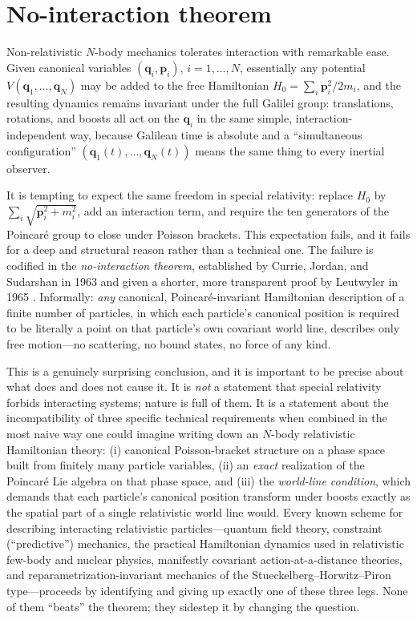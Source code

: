 \section{No-interaction theorem}
\label{sec:sr-no-int}

Non-relativistic $N$-body mechanics tolerates interaction with remarkable ease.
Given canonical variables $({\bm q}_i,{\bm p}_i)$, $i=1,\dots,N$, essentially any
potential $V({\bm q}_1,\dots,{\bm q}_N)$ may be added to the free Hamiltonian
$H_0=\sum_i {\bm p}_i^2/2m_i$, and the resulting dynamics remains invariant under
the full Galilei group: translations, rotations, and boosts all act on the
${\bm q}_i$ in the same simple, interaction-independent way, because Galilean time
is absolute and a ``simultaneous configuration'' $({\bm q}_1(t),\dots,{\bm q}_N(t))$
means the same thing to every inertial observer.

It is tempting to expect the same freedom in special relativity: replace $H_0$
by $\sum_i\sqrt{{\bm p}_i^2+m_i^2}$, add an interaction term, and require the ten
generators of the Poincar\'e group to close under Poisson brackets. This
expectation fails, and it fails for a deep and structural reason rather than a
technical one. The failure is codified in the \emph{no-interaction theorem},
established by Currie, Jordan, and Sudarshan in 1963 \cite{CurrieJordanSudarshan1963}
and given a shorter, more transparent proof by Leutwyler in 1965
\cite{Leutwyler1965}. Informally: \emph{any} canonical,
Poincar\'e-invariant Hamiltonian description of a finite number of particles,
in which each particle's canonical position is required to be literally a point
on that particle's own covariant world line, describes only free motion---no
scattering, no bound states, no force of any kind.

This is a genuinely surprising conclusion, and it is important to be precise
about what does and does not cause it. It is \emph{not} a statement that
special relativity forbids interacting systems; nature is full of them. It is a
statement about the incompatibility of three specific technical requirements
when combined in the most naive way one could imagine writing down an $N$-body
relativistic Hamiltonian theory: (i) canonical Poisson-bracket structure on a
phase space built from finitely many particle variables, (ii) an \emph{exact}
realization of the Poincar\'e Lie algebra on that phase space, and (iii) the
\emph{world-line condition}, which demands that each particle's canonical
position transform under boosts exactly as the spatial part of a single
relativistic world line would. Every known scheme for describing interacting
relativistic particles---quantum field theory, constraint (``predictive'')
mechanics, the practical Hamiltonian dynamics used in relativistic few-body and
nuclear physics, manifestly covariant action-at-a-distance theories, and
reparametrization-invariant mechanics of the Stueckelberg--Horwitz--Piron
type---proceeds by identifying and giving up exactly one of these three legs.
None of them ``beats'' the theorem; they sidestep it by changing the question.


